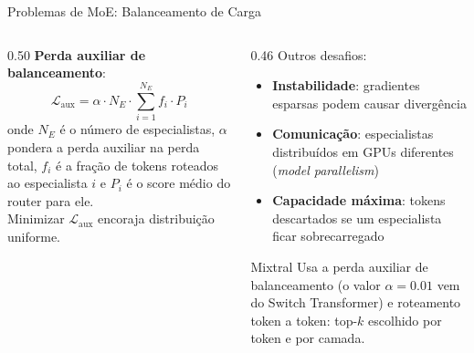 \documentclass[aspectratio=169, xcolor=dvipsnames]{beamer}
\begin{document}
  \begin{frame}{Problemas de MoE: Balanceamento de Carga}
    \small
    \begin{columns}[T]
      \begin{column}{0.50\textwidth}
        \textbf{Perda auxiliar de balanceamento}:
        \[
          \mathcal{L}_\text{aux} = \alpha \cdot N_E \cdot \sum_{i=1}^{N_E} f_i \cdot P_i
        \]
        onde $N_E$ é o número de especialistas, $\alpha$ pondera a perda auxiliar na perda total, $f_i$ é a fração de tokens roteados ao especialista $i$ e $P_i$ é o score médio do router para ele.\\[0.3em]
        Minimizar $\mathcal{L}_\text{aux}$ encoraja distribuição uniforme.
      \end{column}
      \begin{column}{0.46\textwidth}
        Outros desafios:
        \begin{itemize}
          \item \textbf{Instabilidade}: gradientes esparsas podem causar divergência
          \item \textbf{Comunicação}: especialistas distribuídos em GPUs diferentes (\textit{model parallelism})
          \item \textbf{Capacidade máxima}: tokens descartados se um especialista ficar sobrecarregado
        \end{itemize}
        \vspace{-0.3em}
        \begin{exampleblock}{Mixtral}
          Usa a perda auxiliar de balanceamento (o valor $\alpha=0.01$ vem do Switch Transformer) e roteamento token a token: top-$k$ escolhido por token e por camada.
        \end{exampleblock}
      \end{column}
    \end{columns}
  \end{frame}
\end{document}
